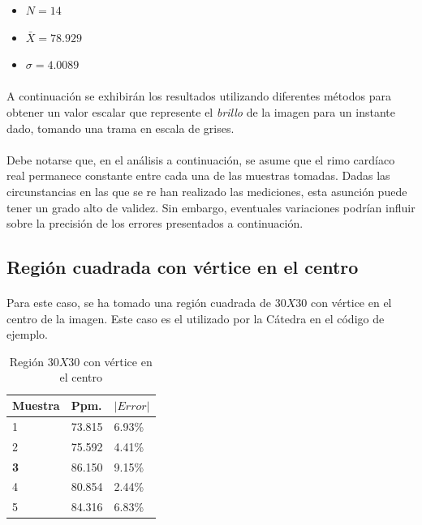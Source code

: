 \documentclass[12pt, twocolumn]{article}
\begin{document}
	\begin{itemize}
		\item $N = 14$
		\item $\bar{X} = 78.929$
		\item $\sigma = 4.0089$
	\end{itemize}
	
	\paragraph{} A continuación se exhibirán los resultados utilizando diferentes métodos para obtener un valor escalar que represente el \textit{brillo} de la imagen para un instante dado, tomando una trama en escala de grises. 
	
	\paragraph{} Debe notarse que, en el análisis a continuación, se asume que el rimo cardíaco real permanece constante entre cada una de las muestras tomadas. Dadas las circunstancias en las que se re han realizado las mediciones, esta asunción puede tener un grado alto de validez. Sin embargo, eventuales variaciones podrían influir sobre la precisión de los errores presentados a continuación.
	
	\subsection{Región cuadrada con vértice en el centro}
	
	\paragraph{} Para este caso, se ha tomado una región cuadrada de $30X30$ con vértice en el centro de la imagen. Este caso es el utilizado por la Cátedra en el código de ejemplo.
	
	\begin{table}[H]
		\centering
		\begin{tabular}{@{}lll@{}}
			\toprule
			Muestra & Ppm.   & $|Error|$  \\ \midrule
			1    & 73.815 & 6.93\% \\
			2    & 75.592 & 4.41\% \\
			\textbf{3}    & 86.150 & 9.15\% \\
			4    & 80.854 & 2.44\% \\
			5    & 84.316 & 6.83\% \\ \bottomrule
		\end{tabular}
		\caption{Región $30X30$ con vértice en el centro}
		\label{3030}
	\end{table}
	
\end{document}

